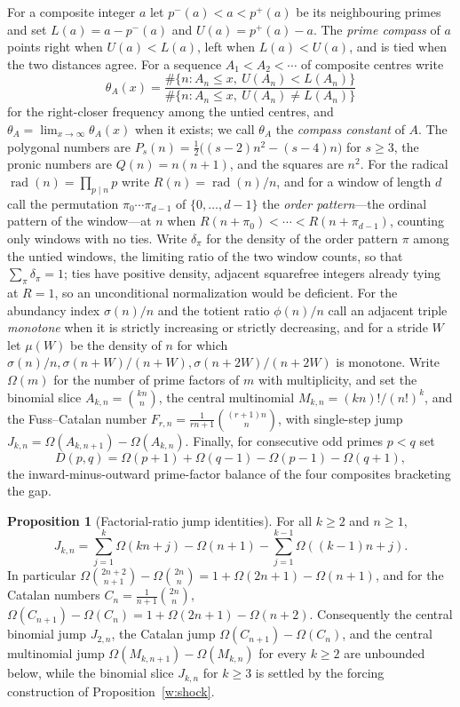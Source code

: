 \documentclass[11pt]{article}
\theoremstyle{definition}
\newtheorem{proposition}{Proposition}
\begin{document}
For a composite integer $a$ let $p^-(a)<a<p^+(a)$ be its neighbouring primes and set $L(a)=a-p^-(a)$ and $U(a)=p^+(a)-a$.  The \emph{prime compass} of $a$ points right when $U(a)<L(a)$, left when $L(a)<U(a)$, and is tied when the two distances agree.  For a sequence $A_1<A_2<\cdots$ of composite centres write
\[
\theta_A(x)=\frac{\#\{n:A_n\le x,\ U(A_n)<L(A_n)\}}{\#\{n:A_n\le x,\ U(A_n)\ne L(A_n)\}}
\]
for the right-closer frequency among the untied centres, and $\theta_A=\lim_{x\to\infty}\theta_A(x)$ when it exists; we call $\theta_A$ the \emph{compass constant} of $A$.  The polygonal numbers are $P_s(n)=\tfrac12\bigl((s-2)n^2-(s-4)n\bigr)$ for $s\ge3$, the pronic numbers are $Q(n)=n(n+1)$, and the squares are $n^2$.  For the radical $\operatorname{rad}(n)=\prod_{p\mid n}p$ write $R(n)=\operatorname{rad}(n)/n$, and for a window of length $d$ call the permutation $\pi_0\cdots\pi_{d-1}$ of $\{0,\ldots,d-1\}$ the \emph{order pattern}---the ordinal pattern of the window---at $n$ when $R(n+\pi_0)<\cdots<R(n+\pi_{d-1})$, counting only windows with no ties.  Write $\delta_\pi$ for the density of the order pattern $\pi$ among the untied windows, the limiting ratio of the two window counts, so that $\sum_\pi\delta_\pi=1$; ties have positive density, adjacent squarefree integers already tying at $R=1$, so an unconditional normalization would be deficient.  For the abundancy index $\sigma(n)/n$ and the totient ratio $\phi(n)/n$ call an adjacent triple \emph{monotone} when it is strictly increasing or strictly decreasing, and for a stride $W$ let $\mu(W)$ be the density of $n$ for which $\sigma(n)/n,\sigma(n+W)/(n+W),\sigma(n+2W)/(n+2W)$ is monotone.  Write $\Omega(m)$ for the number of prime factors of $m$ with multiplicity, and set the binomial slice $A_{k,n}=\binom{kn}{n}$, the central multinomial $M_{k,n}=(kn)!/(n!)^k$, and the Fuss--Catalan number $F_{r,n}=\tfrac1{rn+1}\binom{(r+1)n}{n}$, with single-step jump $J_{k,n}=\Omega(A_{k,n+1})-\Omega(A_{k,n})$.  Finally, for consecutive odd primes $p<q$ set
\[
D(p,q)=\Omega(p+1)+\Omega(q-1)-\Omega(p-1)-\Omega(q+1),
\]
the inward-minus-outward prime-factor balance of the four composites bracketing the gap.

\begin{proposition}[Factorial-ratio jump identities]\label{w:jump}
For all $k\ge2$ and $n\ge1$,
\[
J_{k,n}=\sum_{j=1}^{k}\Omega(kn+j)-\Omega(n+1)-\sum_{j=1}^{k-1}\Omega((k-1)n+j).
\]
In particular $\Omega\binom{2n+2}{n+1}-\Omega\binom{2n}{n}=1+\Omega(2n+1)-\Omega(n+1)$, and for the Catalan numbers $C_n=\tfrac1{n+1}\binom{2n}{n}$, $\Omega(C_{n+1})-\Omega(C_n)=1+\Omega(2n+1)-\Omega(n+2)$.  Consequently the central binomial jump $J_{2,n}$, the Catalan jump $\Omega(C_{n+1})-\Omega(C_n)$, and the central multinomial jump $\Omega(M_{k,n+1})-\Omega(M_{k,n})$ for every $k\ge2$ are unbounded below, while the binomial slice $J_{k,n}$ for $k\ge3$ is settled by the forcing construction of Proposition~\ref{w:shock}.
\end{proposition}
\end{document}
